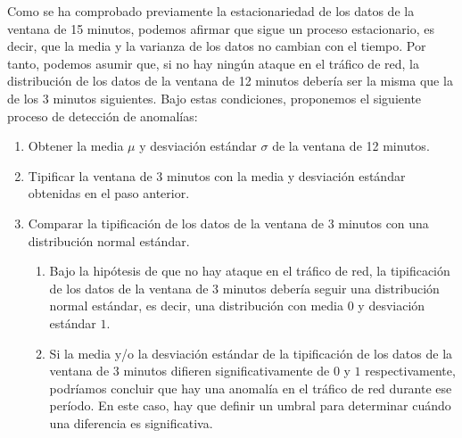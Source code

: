 Como se ha comprobado previamente la estacionariedad de los datos de la ventana de 15 minutos, podemos afirmar que sigue un proceso estacionario, es decir, que la media y la varianza de los datos no cambian con el tiempo. Por tanto, podemos asumir que, si no hay ningún ataque en el tráfico de red, la distribución de los datos de la ventana de 12 minutos debería ser la misma que la de los 3 minutos siguientes.
Bajo estas condiciones, proponemos el siguiente proceso de detección de anomalías:
\begin{enumerate}
    \item Obtener la media $\mu$ y desviación estándar $\sigma$ de la ventana de 12 minutos.
    \item Tipificar la ventana de 3 minutos con la media y desviación estándar obtenidas en el paso anterior.
    \item Comparar la tipificación de los datos de la ventana de 3 minutos con una distribución normal estándar.
    
    \begin{enumerate}
        \item Bajo la hipótesis de que no hay ataque en el tráfico de red, la tipificación de los datos de la ventana de 3 minutos debería seguir una distribución normal estándar, es decir, una distribución con media $0$ y desviación estándar $1$.
        \item Si la media y/o la desviación estándar de la tipificación de los datos de la ventana de 3 minutos difieren significativamente de $0$ y $1$ respectivamente, podríamos concluir que hay una anomalía en el tráfico de red durante ese período. En este caso, hay que definir un umbral para determinar cuándo una diferencia es significativa.
    \end{enumerate}
\end{enumerate}
